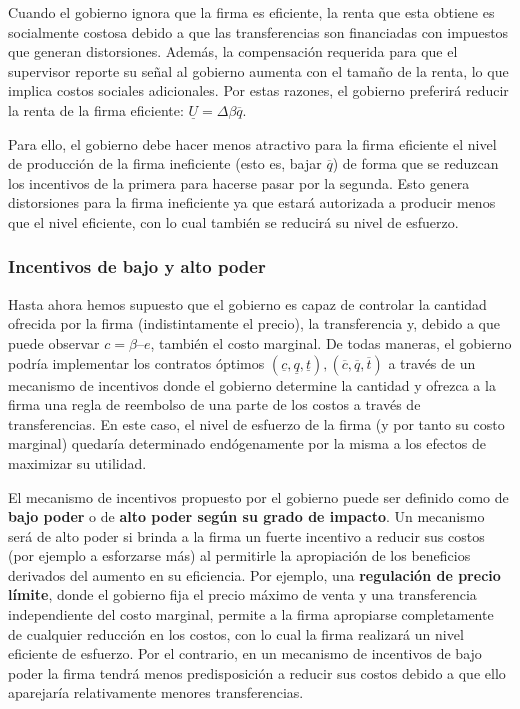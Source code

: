\documentclass[
  12pt,
  spanish,
]{book}
\begin{document}
Cuando el gobierno ignora que la firma es eficiente, la renta que esta obtiene es socialmente costosa debido a que las transferencias son financiadas con impuestos que generan distorsiones. Además, la compensación requerida para que el supervisor reporte su señal al gobierno aumenta con el tamaño de la renta, lo que implica costos sociales adicionales. Por estas razones, el gobierno preferirá reducir la renta de la firma eficiente: \(\underline U = Δβ \overline q\).

Para ello, el gobierno debe hacer menos atractivo para la firma eficiente el nivel de producción de la firma ineficiente (esto es, bajar \(\overline q\)) de forma que se reduzcan los incentivos de la primera para hacerse pasar por la segunda. Esto genera distorsiones para la firma ineficiente ya que estará autorizada a producir menos que el nivel eficiente, con lo cual también se reducirá su nivel de esfuerzo.

\hypertarget{incentivos-de-bajo-y-alto-poder}{%
\subsubsection{Incentivos de bajo y alto poder}\label{incentivos-de-bajo-y-alto-poder}}

Hasta ahora hemos supuesto que el gobierno es capaz de controlar la cantidad ofrecida por la firma (indistintamente el precio), la transferencia y, debido a que puede observar \(c = β – e\), también el costo marginal. De todas maneras, el gobierno podría implementar los contratos óptimos \({(\underline c, \underline q, \underline t), (\overline c, \overline q, \overline t)}\) a través de un mecanismo de incentivos donde el gobierno determine la cantidad y ofrezca a la firma una regla de reembolso de una parte de los costos a través de transferencias. En este caso, el nivel de esfuerzo de la firma (y por tanto su costo marginal) quedaría determinado endógenamente por la misma a los efectos de maximizar su utilidad.

El mecanismo de incentivos propuesto por el gobierno puede ser definido como de \textbf{bajo poder} o de \textbf{alto poder según su grado de impacto}. Un mecanismo será de alto poder si brinda a la firma un fuerte incentivo a reducir sus costos (por ejemplo a esforzarse más) al permitirle la apropiación de los beneficios derivados del aumento en su eficiencia. Por ejemplo, una \textbf{regulación de precio límite}, donde el gobierno fija el precio máximo de venta y una transferencia independiente del costo marginal, permite a la firma apropiarse completamente de cualquier reducción en los costos, con lo cual
la firma realizará un nivel eficiente de esfuerzo. Por el contrario, en un mecanismo de incentivos de bajo poder la firma tendrá menos predisposición a reducir sus costos debido a que ello aparejaría relativamente menores transferencias.
\end{document}
